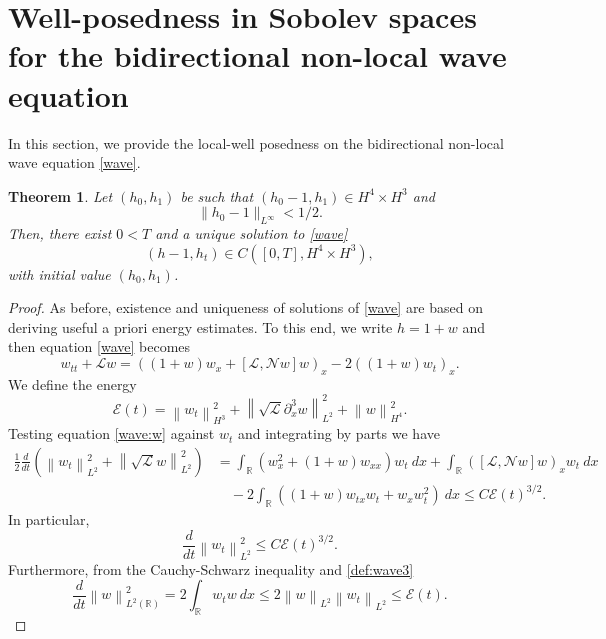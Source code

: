\documentclass[final,11pt,a4paper,reqno]{amsart}
\newcommand{\norm}[1]{\left\| #1 \right\|}
\newcommand{\RR}{\mathbb R}
\newcommand{\pa}{\partial}
\newtheorem{theorem}{Theorem}
\theoremstyle{definition}
\begin{document}
\section{Well-posedness in Sobolev spaces for the bidirectional non-local wave equation}\label{sec:bidirec}
In this section, we provide the local-well posedness on the bidirectional non-local wave equation \eqref{wave}.  

\begin{theorem}\label{thn:bid:wave}
Let $(h_0,h_1)$ be such that $(h_0-1,h_1)\in H^4\times H^3$ and
$$
\|h_0-1\|_{L^\infty}<1/2.
$$
Then, there exist $0<T$ and a unique solution to \eqref{wave}
$$
(h-1,h_t)\in C([0,T],H^4\times H^3),
$$ with initial value $(h_0,h_1)$. 
\end{theorem}

\begin{proof}
As before, existence and uniqueness of solutions of  \eqref{wave} are based on deriving useful a priori energy estimates. To this end, we write $h=1+w$ and then equation \eqref{wave} becomes 
\begin{equation}\label{wave:w}
w_{tt}+\mathscr{L}w=\left((1+w)w_x+\left[\mathscr{L},\mathscr{N}w\right]w\right)_{x}-2\left((1+w)w_t\right)_x.
\end{equation}
We define the energy
\begin{equation}\label{def:wave3}
\mathcal{E}(t)=\norm{w_{t}}^{2}_{H^3}+\norm{\sqrt{\mathscr{L}}\pa_{x}^{3}w}^{2}_{L^2}+\norm{w}^{2}_{H^4}.
\end{equation}
Testing equation \eqref{wave:w} against $w_{t}$ and integrating by parts we have
\begin{align*}
\frac{1}{2}\frac{d}{dt}\left(\norm{w_{t}}_{L^{2}}^{2}+\norm{\sqrt{\mathscr{L}}w}_{L^{2}}^{2}\right)&=\int_{\RR}(w_{x}^{2}+(1+w)w_{xx})w_{t}  \ dx +\int_{\RR} \left(\left[\mathscr{L},\mathscr{N}w\right]w\right)_{x} w_{t} \ dx  \nonumber \\
&\quad - 2\int_{\RR}\left( (1+w)w_{tx}w_{t}+w_{x}w_{t}^{2}\right) \ dx\leq C \mathcal{E}(t)^{3/2}.
\end{align*}
In particular,
\begin{equation*}\label{L2:est:wave}
\frac{d}{dt} \norm{w_{t}}_{L^{2}}^{2}\leq C \mathcal{E}(t)^{3/2}.
\end{equation*}
Furthermore, from the Cauchy-Schwarz inequality and \eqref{def:wave3}
\begin{equation*}
\frac{d}{dt}\norm{w}_{L^{2}(\RR)}^{2}=2\int_{\RR}w_{t}w \  dx \leq 2\norm{w}_{L^2}\norm{w_{t}}_{L^2} \leq \mathcal{E}(t).
\end{equation*}

\end{proof}
\end{document}
